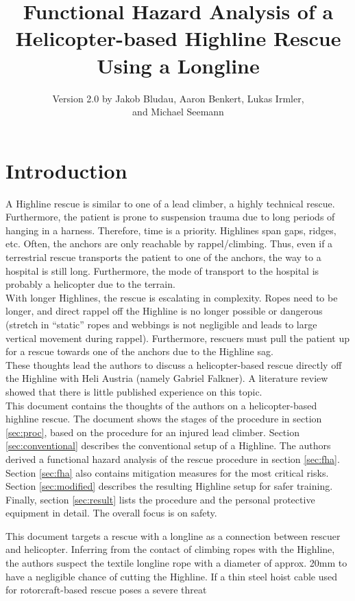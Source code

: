 \documentclass[a4paper,10pt]{scrartcl}
\title{Functional Hazard Analysis of a Helicopter-based Highline Rescue Using a Longline}
\author{Version 2.0 by Jakob Bludau, Aaron Benkert, Lukas Irmler,\\ and Michael Seemann}
\begin{document}
\maketitle

\tableofcontents

\section{Introduction}
\label{sec:intro}
A Highline rescue is similar to one of a lead climber, a highly technical rescue. Furthermore, the patient is prone to suspension trauma due to long periods of hanging in a harness. Therefore, time is a priority.
Highlines span gaps, ridges, etc. Often, the anchors are only reachable by rappel/climbing. Thus, even if a terrestrial rescue transports the patient to one of the anchors, the way to a hospital is still long. Furthermore, the mode of transport to the hospital is probably a helicopter due to the terrain.\\

With longer Highlines, the rescue is escalating in complexity. Ropes need to be longer, and direct rappel off the Highline is no longer possible or dangerous (stretch in “static” ropes and webbings is not negligible and leads to large vertical movement during rappel). Furthermore, rescuers must pull the patient up for a rescue towards one of the anchors due to the Highline sag. \\

These thoughts lead the authors to discuss a helicopter-based rescue directly off the Highline with Heli Austria (namely Gabriel Falkner). A literature review showed that there is little published experience on this topic.\\

This document contains the thoughts of the authors on a helicopter-based highline rescue. The document shows the stages of the procedure in section \ref{sec:proc}, based on the procedure for an injured lead climber. Section \ref{sec:conventional} describes the conventional setup of a Highline. The authors derived a functional hazard analysis of the rescue procedure in section \ref{sec:fha}. Section \ref{sec:fha} also contains mitigation measures for the most critical risks. Section \ref{sec:modified} describes the resulting Highline setup for safer training. Finally, section \ref{sec:result} lists the procedure and the personal protective equipment in detail. The overall focus is on safety.

This document targets a rescue with a longline as a connection between rescuer and helicopter. Inferring from the contact of climbing ropes with the Highline, the authors suspect the textile longline rope with a diameter of approx. 20mm to have a negligible chance of cutting the Highline. If a thin steel hoist cable used for rotorcraft-based rescue poses a severe threat 
\end{document}
